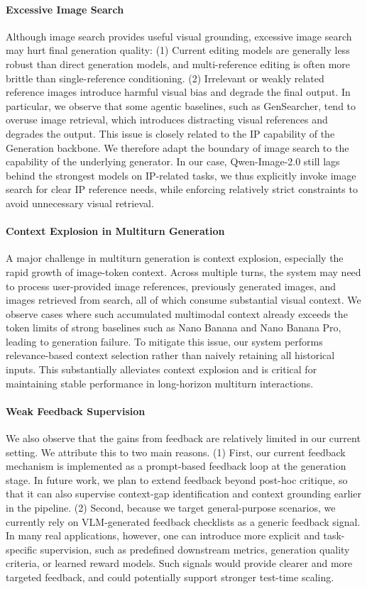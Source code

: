 \paragraph{Excessive Image Search}
Although image search provides useful visual grounding, excessive image search may hurt final generation quality: (1) Current editing models are generally less robust than direct generation models, and multi-reference editing is often more brittle than single-reference conditioning. (2) Irrelevant or weakly related reference images introduce harmful visual bias and degrade the final output. In particular, we observe that some agentic baselines, such as GenSearcher, tend to overuse image retrieval, which introduces distracting visual references and degrades the output. This issue is closely related to the IP capability of the Generation backbone. We therefore adapt the boundary of image search to the capability of the underlying generator. In our case, Qwen-Image-2.0 still lags behind the strongest models on IP-related tasks, we thus explicitly invoke image search for clear IP reference needs, while enforcing relatively strict constraints to avoid unnecessary visual retrieval.

\paragraph{Context Explosion in Multiturn Generation}
A major challenge in multiturn generation is context explosion, especially the rapid growth of image-token context. Across multiple turns, the system may need to process user-provided image references, previously generated images, and images retrieved from search, all of which consume substantial visual context. We observe cases where such accumulated multimodal context already exceeds the token limits of strong baselines such as Nano Banana and Nano Banana Pro, leading to generation failure. To mitigate this issue, our system performs relevance-based context selection rather than naively retaining all historical inputs. This substantially alleviates context explosion and is critical for maintaining stable performance in long-horizon multiturn interactions.

\paragraph{Weak Feedback Supervision}
We also observe that the gains from feedback are relatively limited in our current setting. We attribute this to two main reasons. (1) First, our current feedback mechanism is implemented as a prompt-based feedback loop at the generation stage. In future work, we plan to extend feedback beyond post-hoc critique, so that it can also supervise context-gap identification and context grounding earlier in the pipeline. (2) Second, because we target general-purpose scenarios, we currently rely on VLM-generated feedback checklists as a generic feedback signal. In many real applications, however, one can introduce more explicit and task-specific supervision, such as predefined downstream metrics, generation quality criteria, or learned reward models. Such signals would provide clearer and more targeted feedback, and could potentially support stronger test-time scaling.

